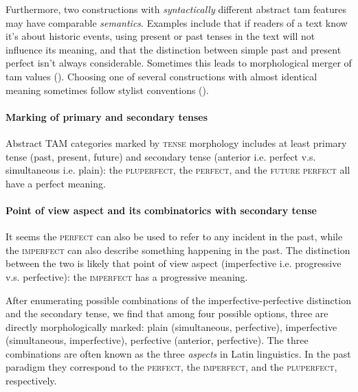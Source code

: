 \documentclass[a4paper, oneside, 12pt]{report}
\newcommand*{\term}[1]{\emph{#1}}
\newcommand*{\category}[1]{\textsc{#1}}
\begin{document}
Furthermore, two constructions with \emph{syntactically} different abstract \ac{tam} features
may have comparable \emph{semantics}.
Examples include that if readers of a text know it's about historic events,
using present or past tenses in the text will not influence its meaning,
and that the distinction between simple past and present perfect isn't always considerable.
Sometimes this leads to morphological merger of \ac{tam} values
().
Choosing one of several constructions with almost identical meaning
sometimes follow stylist conventions
().

\paragraph*{Marking of primary and secondary tenses}
Abstract TAM categories marked by \category{tense} morphology includes
at least primary tense (past, present, future) and
secondary tense (anterior i.e. perfect v.s. simultaneous i.e. plain):
the \category{pluperfect}, the \category{perfect}, and the \category{future perfect}
all have a perfect meaning.

\paragraph*{Point of view aspect and its combinatorics with secondary tense}
It seems the \category{perfect} can also be used to refer to any incident in the past,
while the \category{imperfect} can also describe something happening in the past.
The distinction between the two is likely that point of view aspect (imperfective i.e. progressive v.s. perfective):
the \category{imperfect} has a progressive meaning.

After enumerating possible combinations of the imperfective-perfective distinction and the secondary tense, 
we find that among four possible options,
three are directly morphologically marked: 
plain (simultaneous, perfective), 
imperfective (simultaneous, imperfective), 
perfective (anterior, perfective). 
The three combinations are often known as the three \term{aspects} in Latin linguistics.
In the past paradigm they correspond to
the \category{perfect}, the \category{imperfect}, and the \category{pluperfect}, respectively.
\end{document}
